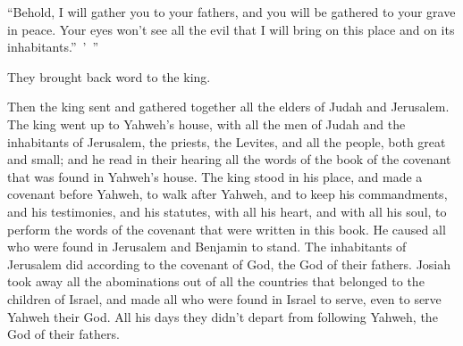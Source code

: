 {“Behold, I will gather you to your fathers, and you will be gathered to your grave in peace. Your eyes won’t see all the evil that I will bring on this place and on its inhabitants.” ’ ”
\par }{\PP They brought back word to the king.
\par }{\PP {}Then the king sent and gathered together all the elders of Judah and Jerusalem.
The king went up to Yahweh’s house, with all the men of Judah and the inhabitants of Jerusalem, the priests, the Levites, and all the people, both great and small; and he read in their hearing all the words of the book of the covenant that was found in Yahweh’s house.
The king stood in his place, and made a covenant before Yahweh, to walk after Yahweh, and to keep his commandments, and his testimonies, and his statutes, with all his heart, and with all his soul, to perform the words of the covenant that were written in this book.
He caused all who were found in Jerusalem and Benjamin to stand. The inhabitants of Jerusalem did according to the covenant of God, the God of their fathers.
Josiah took away all the abominations out of all the countries that belonged to the children of Israel, and made all who were found in Israel to serve, even to serve Yahweh their God. All his days they didn’t depart from following Yahweh, the God of their fathers.

}
